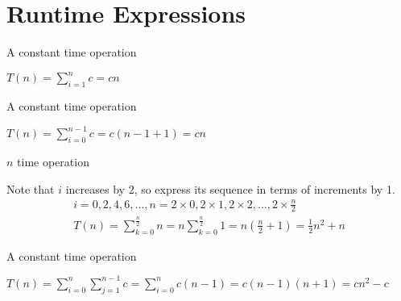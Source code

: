 \section{Runtime Expressions}

\begin{multicols}{2}
  \noindent \hrulefill
  \begin{algorithmic}
     
    \State A constant time operation
    \EndFor
  \end{algorithmic}
  \noindent \hrulefill

  $T(n) = \sum_{i=1}^{n} c = cn$

  \columnbreak

  \noindent \hrulefill
  \begin{algorithmic}
     
    \State A constant time operation
    \EndFor
  \end{algorithmic}
  \noindent \hrulefill

  $T(n) = \sum_{i=0}^{n-1} c = c(n - 1 + 1) = cn$
\end{multicols}

\begin{multicols}{2}
  \noindent \hrulefill
  \begin{algorithmic}[1]
    \State $n$ time operation
    \EndFor
  \end{algorithmic}
  \noindent \hrulefill

  \noindent Note that $i$ increases by 2, so express its sequence in terms of increments by 1.
  \begin{align*}
    i = 0, 2, 4, 6, ..., n = 2 \times 0, 2 \times 1, 2 \times 2, ..., 2 \times \frac{n}{2} \\
    T(n) = \sum_{k=0}^{\frac{n}{2}} n = n \sum_{k=0}^{\frac{n}{2}} 1 = n (\frac{n}{2} + 1) = \frac{1}{2} n^2 + n
  \end{align*}

  \columnbreak

  \noindent \hrulefill
  \begin{algorithmic}[1]
    \State A constant time operation
    \EndFor
    \EndFor
  \end{algorithmic}
  \noindent \hrulefill

  $T(n) = \sum_{i=0}^{n} \sum_{j=1}^{n-1} c = \sum_{i=0}^{n} c(n - 1) = c(n - 1)(n+1) = cn^2 - c$
\end{multicols}


